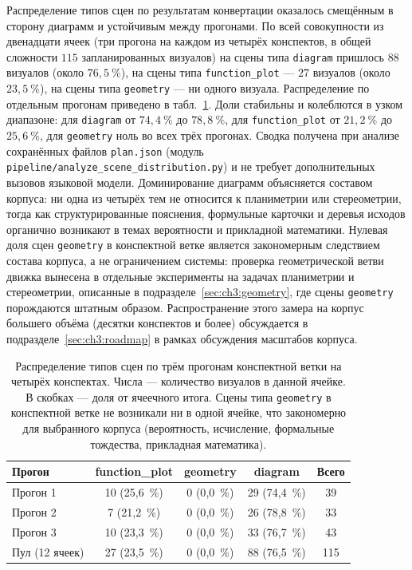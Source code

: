 Распределение типов сцен по результатам конвертации оказалось смещённым в сторону диаграмм и устойчивым между прогонами. По всей совокупности из двенадцати ячеек (три прогона на каждом из четырёх конспектов, в общей сложности \(115\) запланированных визуалов) на сцены типа \texttt{diagram} пришлось \(88\) визуалов (около \(76{,}5~\%\)), на сцены типа \texttt{function\_plot} --- \(27\) визуалов (около \(23{,}5~\%\)), на сцены типа \texttt{geometry} --- ни одного визуала. Распределение по отдельным прогонам приведено в табл.~\ref{tab:ch3:scene-distribution-runs}. Доли стабильны и колеблются в узком диапазоне: для \texttt{diagram} от \(74{,}4~\%\) до \(78{,}8~\%\), для \texttt{function\_plot} от \(21{,}2~\%\) до \(25{,}6~\%\), для \texttt{geometry} ноль во всех трёх прогонах. Сводка получена при анализе сохранённых файлов \texttt{plan.json} (модуль \texttt{pipeline/analyze\_scene\_distribution.py}) и не требует дополнительных вызовов языковой модели. Доминирование диаграмм объясняется составом корпуса: ни одна из четырёх тем не относится к планиметрии или стереометрии, тогда как структурированные пояснения, формульные карточки и деревья исходов органично возникают в темах вероятности и прикладной математики. Нулевая доля сцен \texttt{geometry} в конспектной ветке является закономерным следствием состава корпуса, а не ограничением системы: проверка геометрической ветви движка вынесена в отдельные эксперименты на задачах планиметрии и стереометрии, описанные в подразделе~\ref{sec:ch3:geometry}, где сцены \texttt{geometry} порождаются штатным образом. Распространение этого замера на корпус большего объёма (десятки конспектов и более) обсуждается в подразделе~\ref{sec:ch3:roadmap} в рамках обсуждения масштабов корпуса.

\begin{table}[htbp]
\centering
\caption{Распределение типов сцен по трём прогонам конспектной ветки на четырёх конспектах. Числа --- количество визуалов в данной ячейке. В скобках --- доля от ячеечного итога. Сцены типа \texttt{geometry} в конспектной ветке не возникали ни в одной ячейке, что закономерно для выбранного корпуса (вероятность, исчисление, формальные тождества, прикладная математика).}
\label{tab:ch3:scene-distribution-runs}
\small
\begin{tabular}{lcccc}
\toprule
\textbf{Прогон} & \textbf{function\_plot} & \textbf{geometry} & \textbf{diagram} & \textbf{Всего} \\
\midrule
Прогон 1 & 10 (25{,}6~\%) & 0 (0{,}0~\%) & 29 (74{,}4~\%) & 39 \\
Прогон 2 & 7 (21{,}2~\%)  & 0 (0{,}0~\%) & 26 (78{,}8~\%) & 33 \\
Прогон 3 & 10 (23{,}3~\%) & 0 (0{,}0~\%) & 33 (76{,}7~\%) & 43 \\
\midrule
Пул (12 ячеек) & 27 (23{,}5~\%) & 0 (0{,}0~\%) & 88 (76{,}5~\%) & 115 \\
\bottomrule
\end{tabular}
\end{table}

